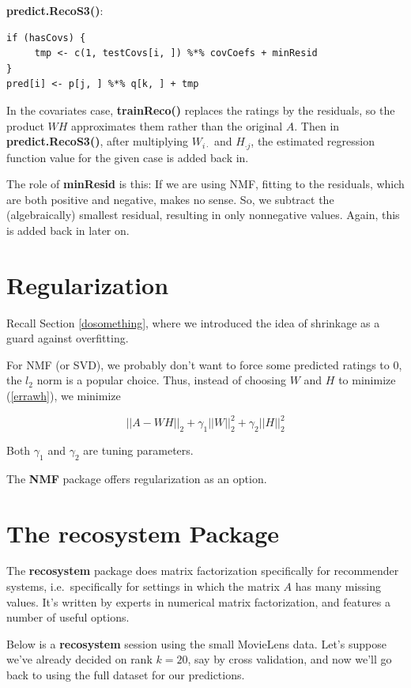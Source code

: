 \textbf{predict.RecoS3()}:

\begin{lstlisting}
if (hasCovs) {
     tmp <- c(1, testCovs[i, ]) %*% covCoefs + minResid
}
pred[i] <- p[j, ] %*% q[k, ] + tmp
\end{lstlisting}

In the covariates case, \textbf{trainReco()} replaces the ratings by the
residuals, so the product $WH$ approximates them rather than the
original $A$.  Then in \textbf{predict.RecoS3()}, after multiplying
$W_{i \cdot}$ and $H_{\cdot j}$, the estimated regression function value
for the given case is added back in.

The role of \textbf{minResid} is this:  If we are using NMF, fitting to the
residuals, which are both positive and negative, makes no sense.  So, we
subtract the (algebraically) smallest residual, resulting in only
nonnegative values.  Again, this is added back in later on.

\section{Regularization}

Recall Section \ref{dosomething}, where we introduced the idea of
shrinkage as a guard against overfitting.

For NMF (or SVD), we probably don't want to force some predicted ratings
to 0, the $l_2$ norm is a popular choice.  Thus, instead of choosing $W$ and
$H$ to minimize (\ref{errawh}), we minimize

\begin{equation}
||A - WH||_2 + \gamma_1 ||W||_2^2 + \gamma_2 ||H||_2^2
\end{equation}

Both $\gamma_1$ and $\gamma_2$ are tuning parameters.

The \textbf{NMF} package offers regularization as an option.

\section{The recosystem Package}

The \textbf{recosystem} package does matrix factorization specifically
for recommender systems, i.e.\ specifically for settings in which the
matrix $A$ has many missing values.  It's written by experts in
numerical matrix factorization, and features a number of useful options.

Below is a \textbf{recosystem} session using the small MovieLens data.
Let's suppose we've already decided on rank $k = 20$, say by cross
validation, and now we'll go back to using the full dataset for our
predictions.

